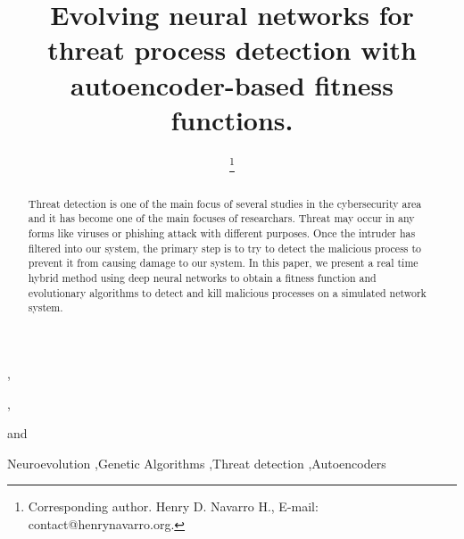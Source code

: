 \documentclass{iosart2c}
\begin{document}
\begin{frontmatter}                           %

%
\title{Evolving neural networks for threat process detection with autoencoder-based fitness functions.}



\author[A,B]{ \thanks{Corresponding author. Henry D. Navarro H., E-mail: contact@henrynavarro.org.}},
\author[B]{ },
\author[B]{ }
and
\author[B]{ }
\address[A]{Research and Development Lab, Vision Analytics, Avenida de Europa 19, 28224, Pozuelo de Alarcón, Madrid,\\ Spain\\
E-mail: contact@henrynavarro.org}
\address[B]{Research and Development Labs, Capgemini Engineering, Calle Campezo, 1, 28022, Madrid, Spain.\\
E-mail: engineering@capgemini.com}

\begin{abstract}
Threat detection is one of the main focus of several studies in the cybersecurity area and it has become one of the main focuses of researchars. Threat may occur in any forms like viruses or phishing attack with different purposes. Once the intruder has filtered into our system, the primary step is to try to detect the malicious process to prevent it from causing damage to our system. In this paper, we present a real time hybrid method using deep neural networks to obtain a fitness function and evolutionary algorithms to detect and kill malicious processes on a simulated network system.
\end{abstract}

\begin{keyword}
Neuroevolution \sep Genetic Algorithms \sep Threat detection \sep Autoencoders
\end{keyword}

\end{frontmatter}
\end{document}
